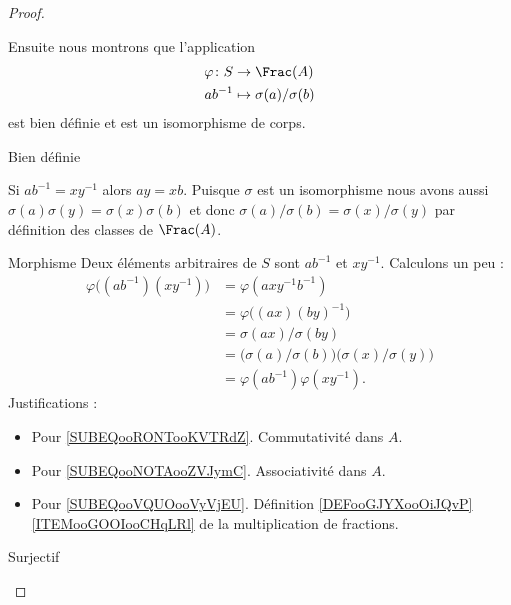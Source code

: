 \begin{proof}
\begin{subproof}
    Ensuite nous montrons que l'application
    \begin{equation}
        \begin{aligned}
            \varphi\colon S&\to \Frac(A) \\
            ab^{-1}&\mapsto \sigma(a)/\sigma(b)
        \end{aligned}
    \end{equation}
    est bien définie et est un isomorphisme de corps.

        \item[Bien définie]

            Si \( ab^{-1}=xy^{-1}\) alors \( ay=xb\). Puisque \( \sigma\) est un isomorphisme nous avons aussi \( \sigma(a)\sigma(y)=\sigma(x)\sigma(b)\) et donc \( \sigma(a)/\sigma(b)=\sigma(x)/\sigma(y)\) par définition des classes de \( \Frac(A)\).
        \item[Morphisme]
            Deux éléments arbitraires de \( S\) sont \( ab^{-1}\) et \( xy^{-1}\). Calculons un peu :
            \begin{subequations}
                \begin{align}
                    \varphi\big( (ab^{-1})(xy^{-1}) \big)&=\varphi(axy^{-1}b^{-1})      \label{SUBEQooRONTooKVTRdZ}\\
                    &=\varphi\big( (ax)(by)^{-1} \big)      \label{SUBEQooNOTAooZVJymC}\\
                    &=\sigma(ax)/\sigma(by)\\
                    &=\big(\sigma(a)/\sigma(b)\big)\big(\sigma(x)/\sigma(y)\big)            \label{SUBEQooVQUOooVyVjEU} \\
                    &=\varphi(ab^{-1})\varphi(xy^{-1}).
                \end{align}
            \end{subequations}
            Justifications :
            \begin{itemize}
                \item Pour \eqref{SUBEQooRONTooKVTRdZ}. Commutativité dans \( A\).
                \item Pour \eqref{SUBEQooNOTAooZVJymC}. Associativité dans \( A\).
                \item Pour \eqref{SUBEQooVQUOooVyVjEU}. Définition \ref{DEFooGJYXooOiJQvP}\ref{ITEMooGOOIooCHqLRl} de la multiplication de fractions.
            \end{itemize}


        \item[Surjectif]


\end{subproof}
\end{proof}
